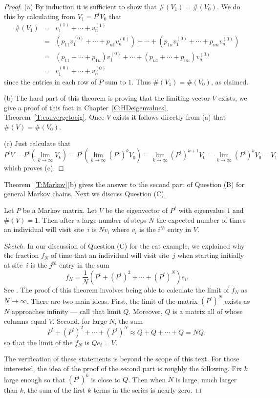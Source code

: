 \documentclass{ximera}
\begin{document}
\begin{proof}  (a) By induction it is sufficient to show that $\#(V_1)=\#(V_0)$.  We
do
this by calculating from $V_1 = P^tV_0$ that
\begin{eqnarray*}
\#(V_1) & = & v_1^{(1)} + \cdots + v_n^{(1)}\\
& = & (p_{11}v_1^{(0)} + \cdots + p_{n1}v_n^{(0)}) + \cdots +
	(p_{1n}v_1^{(0)} + \cdots + p_{nn}v_n^{(0)}) \\
& = & (p_{11}+ \cdots + p_{1n})v_1^{(0)}  + \cdots +
	(p_{n1} + \cdots + p_{nn})v_n^{(0)} \\
& = & v_1^{(0)}  + \cdots + v_n^{(0)}
\end{eqnarray*}
since the entries in each row of $P$ sum to $1$.  Thus $\#(V_1)=\#(V_0)$, as
claimed.

(b)	The hard part of this theorem is proving that the limiting vector $V$
exists; we give a proof of this fact in Chapter~\ref{C:HDeigenvalues},
Theorem~\ref{T:convergetoeig}.  Once $V$ exists it follows directly from (a)
that $\#(V)=\#(V_0)$.

(c)   	Just calculate that
\[
P^tV = P^t(\lim_{k\to\infty}V_k) = P^t(\lim_{k\to\infty}(P^t)^kV_0)
= \lim_{k\to\infty}(P^t)^{k+1}V_0 = \lim_{k\to\infty}(P^t)^kV_0 = V,
\]
which proves (c).   \end{proof}

Theorem~\ref{T:Markov}(b) gives the answer to the second part of Question (B)
for general Markov chains.  Next we discuss Question (C).

\begin{thm} \label{T:ergodic}
Let $P$ be a Markov matrix.
Let $V$ be the eigenvector of $P^t$ with
eigenvalue $1$ and $\#(V)=1$.  Then after a large number of steps $N$ the
expected number of times an individual will visit site~$i$ is $Nv_i$ where
$v_i$ is the $i^{th}$ entry in $V$.
\end{thm}

\begin{proof}[Sketch] In our discussion of Question (C) for the
cat example, we explained why the fraction $f_N$ of time that an individual
will visit site~$j$ when starting initially at site~$i$ is the $j^{th}$ entry
in the sum
\[
f_N = \frac{1}{N}(P^t + (P^t)^2 + \cdots + (P^t)^N)e_i.
\]
See .  The proof of this theorem involves being able to calculate
the limit of $f_N$ as $N\to\infty$.  There are two main ideas.  First, the
limit of the matrix $(P^t)^N$ exists as $N$ approaches infinity --- call that
limit $Q$.  Moreover, $Q$ is a matrix all of whose columns equal $V$.
Second, for large $N$, the sum
\[
P^t + (P^t)^2 + \cdots + (P^t)^N \approx Q + Q + \cdots + Q = NQ,
\]
so that the limit of the $f_N$ is $Qe_i=V$.

The verification of these statements is beyond the scope of this text.
For those interested, the idea of the proof of the second part is roughly the
following.  Fix $k$ large enough so that $(P^t)^k$ is close to $Q$.  Then when
$N$ is large, much larger than $k$, the sum of the first $k$ terms in the
series is nearly zero.  \end{proof}
\end{document}
